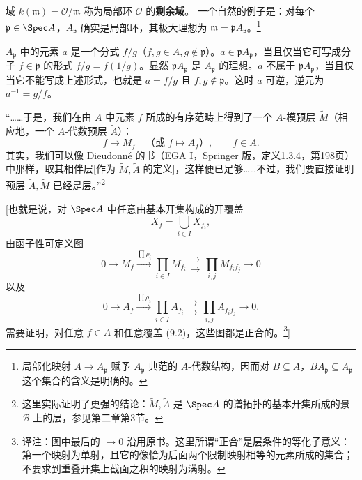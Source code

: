 域 $k(\mathfrak m)=\mathcal O/\mathfrak m$ 称为局部环 $\mathcal O$ 的\textbf{剩余域}。
一个自然的例子是：对每个 $\mathfrak p\in\Spec A$，$A_{\mathfrak p}$ 确实是局部环，其极大理想为 $\mathfrak m=\mathfrak pA_{\mathfrak p}$。\footnote{局部化映射 $A\to A_{\mathfrak p}$ 赋予 $A_{\mathfrak p}$ 典范的 $A$-代数结构，因而对 $B\subseteq A$，$BA_{\mathfrak p}\subseteq A_{\mathfrak p}$ 这个集合的含义是明确的。}

$A_{\mathfrak p}$ 中的元素 $a$ 是一个分式 $f/g$（$f,g\in A,g\notin\mathfrak p$）。$a\in\mathfrak pA_{\mathfrak p}$，当且仅当它可写成分子 $f\in\mathfrak p$ 的形式 $f/g=f(1/g)$。显然 $\mathfrak pA_{\mathfrak p}$ 是 $A_{\mathfrak p}$ 的理想。$a$ 不属于 $\mathfrak pA_{\mathfrak p}$，当且仅当它不能写成上述形式，也就是 $a=f/g$ 且 $f,g\notin\mathfrak p$。这时 $a$ 可逆，逆元为 $a^{-1}=g/f$。

“……于是，我们在由 $A$ 中元素 $f$ 所成的有序范畴上得到了一个 $A$-模预层 $\widetilde M$（相应地，一个 $A$-代数预层 $\widetilde A$）：
\begin{equation}\tag{9.1}
f\longmapsto M_f\quad\text{（或 }f\longmapsto A_f\text{）},\qquad f\in A.
\end{equation}
其实，我们可以像 Dieudonné 的书（EGA I，Springer 版，定义1.3.4，第198页）中那样，取其相伴层[作为 $\widetilde M,\widetilde A$ 的定义]，这样便已足够……不过，我们要直接证明预层 $\widetilde A,\widetilde M$ 已经是层。”\footnote{这里实际证明了更强的结论：$\widetilde M,\widetilde A$ 是 $\Spec A$ 的谱拓扑的基本开集所成的景 $\mathcal B$ 上的层，参见第二章第3节。}

[也就是说，对 $\Spec A$ 中任意由基本开集构成的开覆盖
\begin{equation}\tag{9.2}
X_f=\bigcup_{i\in I}X_{f_i},
\end{equation}
由函子性可定义图
\begin{equation}\tag{9.3}
0\longrightarrow M_f\xrightarrow{\prod\rho_i}
\prod_{i\in I}M_{f_i}\mathrel{\substack{\longrightarrow\\[-.5ex]\longrightarrow}}
\prod_{i,j}M_{f_if_j}\longrightarrow0
\end{equation}
以及
\begin{equation}\tag{9.3$'$}
0\longrightarrow A_f\xrightarrow{\prod\rho_i}
\prod_{i\in I}A_{f_i}\mathrel{\substack{\longrightarrow\\[-.5ex]\longrightarrow}}
\prod_{i,j}A_{f_if_j}\longrightarrow0.
\end{equation}
需要证明，对任意 $f\in A$ 和任意覆盖 (9.2)，这些图都是正合的。\footnote{译注：图中最后的 $\to0$ 沿用原书。这里所谓“正合”是层条件的等化子意义：第一个映射为单射，且它的像恰为后面两个限制映射相等的元素所成的集合；不要求到重叠开集上截面之积的映射为满射。}]

